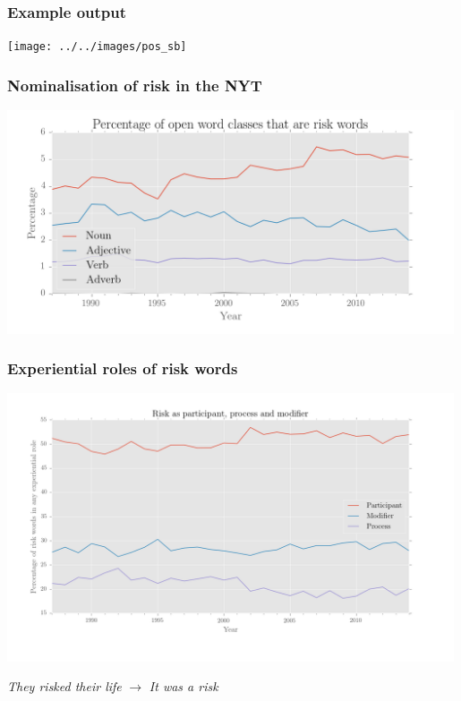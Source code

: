 \documentclass{beamer}       %
\begin{document}
\begin{frame}
    \frametitle{Example output}
    \centering
    \texttt{[image: ../../images/pos\_sb]}
\end{frame}

\begin{frame}
    \frametitle{Nominalisation of risk in the NYT}
    \centering
    \includegraphics[width=0.99\textwidth]{../../images/percentage-of-open-word-classes-that-are-risk-words}
\end{frame}

\begin{frame}
    \frametitle{Experiential roles of risk words}
    \centering
    \includegraphics[width=0.99\textwidth]{../../images/ppm_final_colour}

    \noindent \emph{They risked their life} $\rightarrow$ \emph{It was a risk}
\end{frame}
\end{document}
